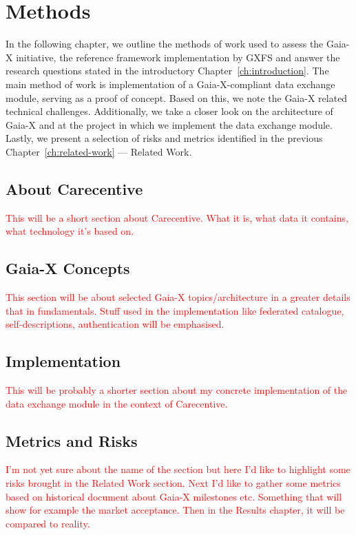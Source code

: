 \chapter{Methods}\label{ch:methods}

\begin{chapterabstract}
    In the following chapter, we outline the methods of work used to assess the Gaia-X initiative, the reference framework implementation by GXFS and answer the research questions stated in the introductory Chapter~\ref{ch:introduction}.
    The main method of work is implementation of a Gaia-X-compliant data exchange module, serving as a proof of concept.
    Based on this, we note the Gaia-X related technical challenges.
    Additionally, we take a closer look on the architecture of Gaia-X and at the project in which we implement the data exchange module.
    Lastly, we present a selection of risks and metrics identified in the previous Chapter~\ref{ch:related-work} --- Related Work.
\end{chapterabstract}

\section{About Carecentive}\label{sec:about-carecentive}

\textcolor{red}{This will be a short section about Carecentive. What it is, what data it contains, what technology it's based on.}

\section{Gaia-X Concepts}\label{sec:gaia-x-concepts}

\textcolor{red}{This section will be about selected Gaia-X topics/architecture in a greater details that in fundamentals. Stuff used in the implementation like federated catalogue, self-descriptions, authentication will be emphasised.}

\section{Implementation}\label{sec:implementation}

\textcolor{red}{This will be probably a shorter section about my concrete implementation of the data exchange module in the context of Carecentive.}

\section{Metrics and Risks}\label{sec:metrics-and-risks}

\textcolor{red}{I'm not yet sure about the name of the section but here I'd like to highlight some risks brought in the Related Work section. Next I'd like to gather some metrics based on historical document about Gaia-X milestones etc. Something that will show for example the market acceptance. Then in the Results chapter, it will be compared to reality.}
